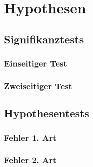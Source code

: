 \documentclass[main.tex]{subfiles}
\begin{document}
\section{Hypothesen}
\subsection{Signifikanztests}
\subsubsection{Einseitiger Test}
\subsubsection{Zweiseitiger Test}
\subsection{Hypothesentests}
\subsubsection{Fehler 1. Art}
\subsubsection{Fehler 2. Art}
\end{document}
